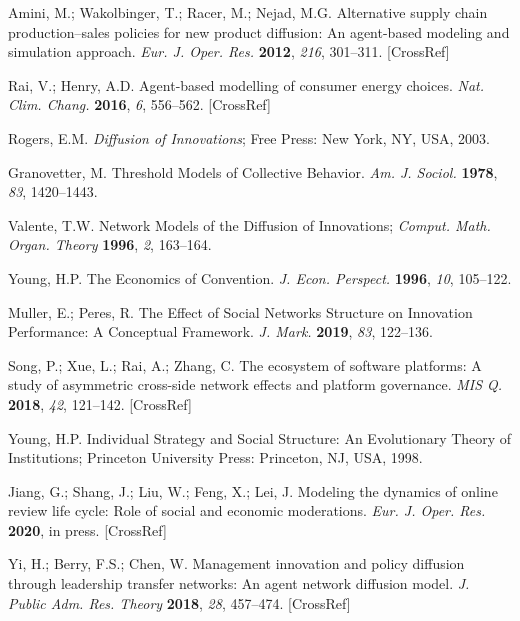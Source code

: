 \documentclass{article} %
\begin{document}
\begin{thebibliography}{9}

Amini, M.; Wakolbinger, T.; Racer, M.; Nejad, M.G. Alternative supply chain production–sales policies for new product diffusion: An agent-based modeling and simulation approach. \textit{Eur. J. Oper. Res.} \textbf{2012}, \textit{216}, 301–311. [CrossRef]

Rai, V.; Henry, A.D. Agent-based modelling of consumer energy choices. \textit{Nat. Clim. Chang.} \textbf{2016}, \textit{6}, 556–562. [CrossRef]

Rogers, E.M. \textit{Diffusion of Innovations}; Free Press: New York, NY, USA, 2003.

Granovetter, M. Threshold Models of Collective Behavior. \textit{Am. J. Sociol.} \textbf{1978}, \textit{83}, 1420–1443.

Valente, T.W. Network Models of the Diffusion of Innovations; \textit{Comput. Math. Organ. Theory} \textbf{1996}, \textit{2}, 163–164.

Young, H.P. The Economics of Convention. \textit{J. Econ. Perspect.} \textbf{1996}, \textit{10}, 105–122.

Muller, E.; Peres, R. The Effect of Social Networks Structure on Innovation Performance: A Conceptual Framework. \textit{J. Mark.} \textbf{2019}, \textit{83}, 122–136.

Song, P.; Xue, L.; Rai, A.; Zhang, C. The ecosystem of software platforms: A study of asymmetric cross-side network effects and platform governance. \textit{MIS Q.} \textbf{2018}, \textit{42}, 121–142. [CrossRef]

Young, H.P. Individual Strategy and Social Structure: An Evolutionary Theory of Institutions; Princeton University Press: Princeton, NJ, USA, 1998.

Jiang, G.; Shang, J.; Liu, W.; Feng, X.; Lei, J. Modeling the dynamics of online review life cycle: Role of social and economic moderations. \textit{Eur. J. Oper. Res.} \textbf{2020}, in press. [CrossRef]

Yi, H.; Berry, F.S.; Chen, W. Management innovation and policy diffusion through leadership transfer networks: An agent network diffusion model. \textit{J. Public Adm. Res. Theory} \textbf{2018}, \textit{28}, 457–474. [CrossRef]


\end{thebibliography}
\end{document}
